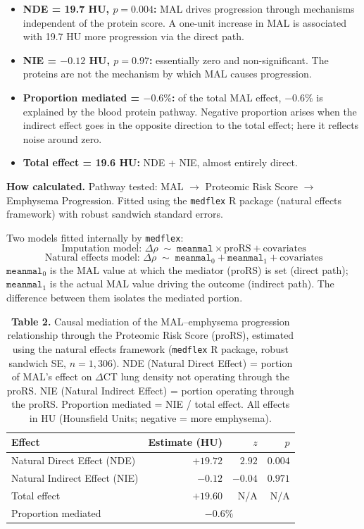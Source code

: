 \documentclass[11pt, letterpaper]{article}
\begin{document}
\begin{itemize}
  \item \textbf{NDE = 19.7 HU, $p = 0.004$:} MAL drives progression
    through mechanisms independent of the protein score. A one-unit
    increase in MAL is associated with 19.7 HU more progression via the
    direct path.
  \item \textbf{NIE = $-0.12$ HU, $p = 0.97$:} essentially zero and
    non-significant. The proteins are not the mechanism by which MAL
    causes progression.
  \item \textbf{Proportion mediated = $-0.6\%$:} of the total MAL
    effect, $-0.6\%$ is explained by the blood protein pathway. Negative
    proportion arises when the indirect effect goes in the opposite
    direction to the total effect; here it reflects noise around zero.
  \item \textbf{Total effect = 19.6 HU:} NDE + NIE, almost entirely
    direct.
\end{itemize}

\textbf{How calculated.}
Pathway tested: MAL $\to$ Proteomic Risk Score $\to$ Emphysema
Progression. Fitted using the \texttt{medflex} R package (natural
effects framework) with robust sandwich standard errors.

Two models fitted internally by \texttt{medflex}:
\[
  \text{Imputation model: }
  \Delta\rho \;\sim\; \texttt{meanmal} \times \text{proRS} + \text{covariates}
\]
\[
  \text{Natural effects model: }
  \Delta\rho \;\sim\; \texttt{meanmal}_0 + \texttt{meanmal}_1 + \text{covariates}
\]
$\texttt{meanmal}_0$ is the MAL value at which the mediator (proRS) is
set (direct path); $\texttt{meanmal}_1$ is the actual MAL value driving
the outcome (indirect path). The difference between them isolates the
mediated portion.

\begin{table}[H]
\centering
\caption*{\textbf{Table 2.} Causal mediation of the MAL--emphysema
  progression relationship through the Proteomic Risk Score (proRS),
  estimated using the natural effects framework (\texttt{medflex} R
  package, robust sandwich SE, $n = 1{,}306$). NDE (Natural Direct
  Effect) = portion of MAL's effect on $\Delta$CT lung density not
  operating through the proRS. NIE (Natural Indirect Effect) = portion
  operating through the proRS. Proportion mediated = NIE / total effect.
  All effects in HU (Hounsfield Units; negative = more emphysema).}
\begin{tabular}{lrrr}
\toprule
Effect & Estimate (HU) & $z$ & $p$ \\
\midrule
Natural Direct Effect (NDE)   & $+19.72$ & $2.92$ & $0.004$ \\
Natural Indirect Effect (NIE) & $-0.12$  & $-0.04$ & $0.971$ \\
Total effect                  & $+19.60$ & N/A    & N/A     \\
Proportion mediated           & \multicolumn{3}{c}{$-0.6\%$} \\
\bottomrule
\end{tabular}
\end{table}
\end{document}
